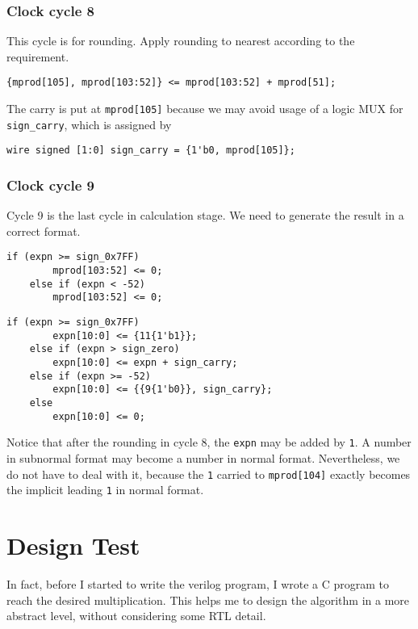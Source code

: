 \documentclass{article}
\begin{document}
            \subsubsection*{Clock cycle 8}
                This cycle is for rounding. Apply rounding to nearest according to the requirement.
                \begin{lstlisting}[style = verilog-style]
    {mprod[105], mprod[103:52]} <= mprod[103:52] + mprod[51];
                \end{lstlisting}

                The carry is put at {\tt mprod[105]} because we may avoid usage of a logic MUX for {\tt sign\_carry}, which is assigned by

                \begin{lstlisting}[style = verilog-style]
    wire signed [1:0] sign_carry = {1'b0, mprod[105]};
                \end{lstlisting}

            \subsubsection*{Clock cycle 9}
                Cycle 9 is the last cycle in calculation stage.
                We need to generate the result in a correct format.

                \begin{lstlisting}[style = verilog-style]
    if (expn >= sign_0x7FF)
        mprod[103:52] <= 0;
    else if (expn < -52)
        mprod[103:52] <= 0;
                \end{lstlisting}
                \begin{lstlisting}[style = verilog-style]
    if (expn >= sign_0x7FF)
        expn[10:0] <= {11{1'b1}};
    else if (expn > sign_zero)
        expn[10:0] <= expn + sign_carry;
    else if (expn >= -52)
        expn[10:0] <= {{9{1'b0}}, sign_carry};
    else
        expn[10:0] <= 0;
                \end{lstlisting}

                Notice that after the rounding in cycle 8, the {\tt expn} may be added by {\tt 1}. A number in subnormal format may become a number in normal format. 
                Nevertheless, we do not have to deal with it, because the {\tt 1} carried to {\tt mprod[104]} exactly becomes the implicit leading {\tt 1} in normal format.
                
    \section{Design Test}
        In fact, before I started to write the verilog program, 
        I wrote a C program to reach the desired multiplication.
        This helps me to design the algorithm in a more abstract level, without considering some RTL detail.
\end{document}
